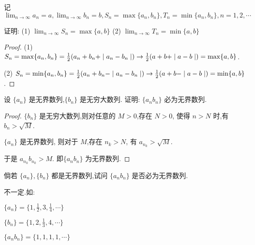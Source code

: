 \begin{practice}
    记 $\lim_{n\to\infty} a_n=a,\lim_{n\to\infty} b_n=b,S_n=\max\{a_n,b_n\},T_n=\min\{a_n,b_n\},n=1,2,\cdots$

    证明: (1) $\lim_{n\to\infty} S_n = \max\{a,b\}$ \qquad (2) $\lim_{n\to\infty} T_n = \min\{a,b\}$
    
\end{practice}

\begin{proof}
    (1) $S_n=\max\{a_n,b_n\}=\frac{1}{2}(a_n+b_n+\mid a_n-b_n \mid) \to \frac{1}{2}(a+b+\mid a-b \mid)=\max\{a,b\}$.

    (2) $S_n=\min\{a_n,b_n\}=\frac{1}{2}(a_n+b_n-\mid a_n-b_n \mid) \to \frac{1}{2}(a+b-\mid a-b \mid)=\min\{a,b\}$.
\end{proof}

\begin{practice}
    设 $\{a_n\}$ 是无界数列,$\{b_n\}$ 是无穷大数列. 证明: $\{a_nb_n\}$ 必为无界数列.
\end{practice}

\begin{proof}
    $\{b_n\}$ 是无穷大数列,则对任意的 $M>0$,存在 $N>0$, 使得 $n>N$ 时,有 $b_n> \sqrt{M}$. 

    $\{a_n\}$ 是无界数列, 则对于 $M$,存在 $n_k>N$, 有 $a_{n_{k}}>\sqrt{M}$. 

    于是 $a_{n_{k}}b_{n_k}>M$. 即$\{a_nb_n\}$ 为无界数列.
\end{proof}

\begin{practice}
    倘若 $\{a_n\},\{b_n\}$ 都是无界数列,试问 $\{a_nb_n\}$ 是否必为无界数列.
\end{practice}

\begin{solve}
    不一定.如:

    $\{a_n\}=\{1,\frac{1}{2},3,\frac{1}{4},\cdots\}$ 

    $\{b_n\}=\{1,2,\frac{1}{3},4,\cdots\}$ 

    $\{a_nb_n\}=\{1,1,1,1,\cdots\}$
\end{solve}

\newsection